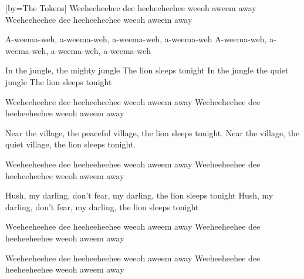 [by={The Tokens}]                            
\beginchorus
Weeheeheehee dee heeheeheehee weeoh aweem away
Weeheeheehee dee heeheeheehee weeoh aweem away
\endchorus

\beginchorus
A-weema-weh, a-weema-weh, a-weema-weh, a-weema-weh
A-weema-weh, a-weema-weh, a-weema-weh, a-weema-weh
\endchorus

\beginverse 
In the jungle, the mighty jungle
The lion sleeps tonight
In the jungle the quiet jungle
The lion sleeps tonight
\endverse

\beginchorus
Weeheeheehee dee heeheeheehee weeoh aweem away
Weeheeheehee dee heeheeheehee weeoh aweem away
\endchorus
 
\beginverse
Near the village, the peaceful village,
the lion sleeps tonight.
Near the village, the quiet village,
the lion sleeps tonight.
\endverse

\beginchorus
Weeheeheehee dee heeheeheehee weeoh aweem away
Weeheeheehee dee heeheeheehee weeoh aweem away
\endchorus

\beginverse 
Hush, my darling, don't fear, my darling,
the lion sleeps tonight
Hush, my darling, don't fear, my darling,
the lion sleeps tonight
\endverse

\beginchorus
Weeheeheehee dee heeheeheehee weeoh aweem away
Weeheeheehee dee heeheeheehee weeoh aweem away
\endchorus

\beginchorus
Weeheeheehee dee heeheeheehee weeoh aweem away
Weeheeheehee dee heeheeheehee weeoh aweem away
\endchorus
\endsong
